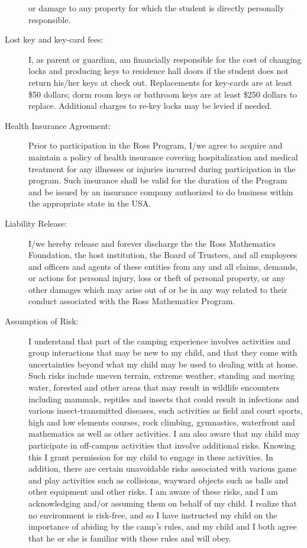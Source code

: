 \documentclass{ross}
\begin{document}
\begin{description}
  or damage to any property for which the student is directly
  personally responsible.
\item[Lost key and key-card fees:] I, as parent or guardian, am
financially responsible for the cost of changing locks and producing
keys to residence hall doors if the student does not return his/her
keys at check out.  Replacements for key-cards are at least \$50
dollars; dorm room keys or bathroom keys are at least \$250 dollars to
replace.  Additional charges to re-key locks may be levied if needed.
\item[Health Insurance Agreement:] Prior to participation in the Ross
  Program, I/we agree to acquire and maintain a policy of health
  insurance covering hospitalization and medical treatment for any
  illnesses or injuries incurred during participation in the
  program. Such insurance shall be valid for the duration of the
  Program and be issued by an insurance company authorized to do
  business within the appropriate state in the USA.
\item[Liability Release:] I/we hereby release and forever discharge
  the the Ross Mathematics Foundation, 
  the host institution, the Board  of Trustees, and 
  all employees and officers and agents of these entities from any
  and all claims, demands, or actions for personal injury, loss or
  theft of personal property, or any other damages which may arise out
  of or be in any way related to their conduct associated with the
  Ross Mathematics Program.
\item[Assumption of Risk:]  I understand that part of the camping experience involves activities and group interactions that may be new to my child, and that they come with uncertainties beyond what my child may be used to dealing with at home. Such risks include uneven terrain, extreme weather, standing and moving water, forested and other areas that may result in wildlife encounters including mammals, reptiles and insects that could result in infections and various insect-transmitted diseases, such activities as field and court sports, high and low elements courses, rock climbing, gymnastics, waterfront and mathematics as well as other activities. I am also aware that my child may participate in off-campus activities that involve additional risks. Knowing this I grant permission for my child to engage in these activities. In addition, there are certain unavoidable risks associated with various game and play activities such as collisions, wayward objects such as balls and other equipment and other risks. I am aware of these risks, and I am acknowledging and/or assuming them on behalf of my child. I realize that no environment is risk-free, and so I have instructed my child on the importance of abiding by the camp’s rules, and my child and I both agree that he or she is familiar with these rules and will obey.

\end{description}
\end{document}
